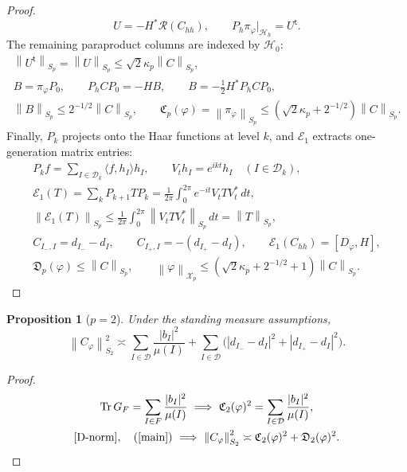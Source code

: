\documentclass[11pt]{amsart}
\newtheorem{proposition}[theorem]{Proposition}
\newcommand{\D}{\mathcal D}
\newcommand{\X}{\mathcal X}
\newcommand{\tr}{\operatorname{Tr}}
\newcommand{\ip}[2]{\langle #1,#2\rangle}
\newcommand{\norm}[1]{\left\|#1\right\|}
\begin{document}
\begin{proof}
\begin{equation}\label{recovery}
 U=-H^*\mathscr R(C_{hh}),\qquad
 P_h\pi_\varphi|_{\mathcal H_h}=U^{\mathsf t}.
\end{equation}
The remaining paraproduct columns are indexed by $\mathcal H_0$:
\begin{gather*}
 \norm{U^{\mathsf t}}_{S_p}=\norm U_{S_p}
       \le\sqrt2\kappa_p\norm C_{S_p},\\
 B=\pi_\varphi P_0,\qquad
 P_hCP_0=-HB,\qquad B=-\tfrac12H^*P_hCP_0,\\
 \norm B_{S_p}\le2^{-1/2}\norm C_{S_p},\qquad
 \mathfrak C_p(\varphi)=\norm{\pi_\varphi}_{S_p}
       \le(\sqrt2\kappa_p+2^{-1/2})\norm C_{S_p}.
\end{gather*}
Finally, $P_k$ projects onto the Haar functions at level $k$, and
$\mathscr E_1$ extracts one-generation matrix entries:
\begin{gather*}
 P_kf=\sum_{I\in\D_k}\ip{f}{h_I}h_I,\qquad
 V_th_I=e^{ikt}h_I\quad(I\in\D_k),\\
 \mathscr E_1(T)=\sum_kP_{k+1}TP_k
   =\frac1{2\pi}\int_0^{2\pi}e^{-it}V_tTV_t^*\,dt,\\
 \norm{\mathscr E_1(T)}_{S_p}
 \le\frac1{2\pi}\int_0^{2\pi}\norm{V_tTV_t^*}_{S_p}\,dt
 =\norm T_{S_p},\\
 C_{I_-,I}=d_{I_-}-d_I,\qquad
 C_{I_+,I}=-(d_{I_+}-d_I),\qquad
 \mathscr E_1(C_{hh})=[D_\varphi,H],\\
 \mathfrak D_p(\varphi)\le\norm C_{S_p},\qquad
 \norm{\varphi}_{\X_p}
 \le(\sqrt2\kappa_p+2^{-1/2}+1)\norm C_{S_p}.
\end{gather*}
\end{proof}

\begin{proposition}[$p=2$]\label{p2}
Under the standing measure assumptions,
\[
 \norm{C_\varphi}_{S_2}^2\asymp
 \sum_{I\in\D}\frac{|b_I|^2}{\mu(I)}
 +\sum_{I\in\D}\big(|d_{I_-}-d_I|^2+|d_{I_+}-d_I|^2\big).
\]
\end{proposition}
\begin{proof}
\begin{gather*}
 \tr G_F=\sum_{I\in F}\frac{|b_I|^2}{\mu(I)}
 \ \Longrightarrow\
 \mathfrak C_2(\varphi)^2
       =\sum_{I\in\D}\frac{|b_I|^2}{\mu(I)},\\
 \eqref{D-norm},\quad(\ref{main})
 \ \Longrightarrow\
 \norm{C_\varphi}_{S_2}^2
       \asymp\mathfrak C_2(\varphi)^2+\mathfrak D_2(\varphi)^2.
\end{gather*}
\end{proof}
\end{document}
